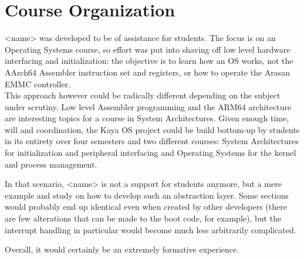 \documentclass[12pt,a4paper,openright,twoside]{report}
\begin{document}
\section{Course Organization}
<name> was developed to be of assistance for students. The focus is on an Operating
Systems course, so effort was put into shaving off low level hardware interfacing
and initialization: the objective is to learn how an OS works, not the AArch64 Assembler
instruction set and registers, or how to operate the Arasan EMMC controller.\\
This approach however could be radically different depending on the subject under 
scrutiny. Low level Assembler programming and the ARM64 architecture are interesting
topics for a course in System Architectures. Given enough time, will and coordination,
the Kaya OS project could be build bottom-up by students in its entirety over four
semesters and two different courses: System Architectures for initialization and
peripheral interfacing and Operating Systems for the kernel and process management.

In that scenario, <name> is not a support for students anymore, but a mere example
and study on how to develop such an abstraction layer. Some sections would probably
end up identical even when created by other developers (there are few alterations
that can be made to the boot code, for example), but the interrupt handling in 
particular would become much less arbitrarily complicated. 

Overall, it would certainly be an extremely formative experience.
\end{document}
